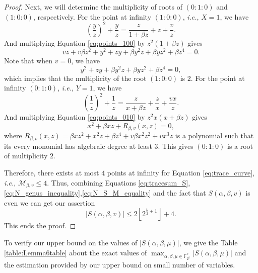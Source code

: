 \documentclass[preprint,10pt]{elsarticle}
\newcommand{\F}{\mathbb{F}}
\newcommand{\0}{\textbf{0}}
\newcommand{\1}{\textbf{1}}
\theoremstyle{plain}
\begin{document}
\begin{proof}
        Next, we will determine the multiplicity of roots of $(0 : 1 : 0)$ and $(1 : 0 : 0)$, respectively.
        For the point at infinity $(1 : 0 : 0)$, \emph{i.e.}, $X = 1$, we have
        \begin{equation}\label{eq:points_100}
            \left( \frac{y}{z} \right)^2+\frac{y}{z}=\frac{z}{1+\beta z}+z+\frac{v}{z}.
        \end{equation}
        And multiplying Equation \eqref{eq:points_100} by $z^2(1+\beta z)$ gives
        \[vz+v\beta z^2+y^2+zy+\beta y^2z+\beta yz^2+\beta z^4=0.\]
        Note that when $v=0$, we have
        \[y^2+zy+\beta y^2z+\beta yz^2+\beta z^4=0,\]
        which implies that the multiplicity of the root $(1:0:0)$ is $2$.
        For the point at infinity $(0 : 1 : 0 )$, \emph{i.e.}, $Y = 1$, we have
        \begin{equation}\label{eq:points_010}
            \left( \frac{1}{z} \right)^2+\frac{1}{z}=\frac{z}{x+\beta z}+\frac{z}{x}+\frac{vx}{z}.
        \end{equation}
        And multiplying Equation \eqref{eq:points_010} by $z^2x(x+\beta z)$ gives
        \[x^2+\beta xz+R_{\beta,v}(x,z)=0,\]
        where $R_{\beta,v}(x,z)=\beta xz^2+x^2z+\beta z^4+v\beta x^2z^2+vx^3z$ is a polynomial
        such that its every monomial has algebraic degree at least $3$.
        This gives $(0 : 1 : 0)$ is a root of multiplicity $2$.

        Therefore, there exists at most $4$ points at infinity for Equation \eqref{eq:trace_curve}, \emph{i.e.},
        $\mathcal{M}_{\beta,v}\le 4$.
        Thus, combining Equations \eqref{eq:tracesum_S},\eqref{eq:N_genus_inequality},\eqref{eq:N_S_M_equality} and the fact that
        $S(\alpha,\beta,v)$ is even we can get our assertion
        \[\left\lvert S(\alpha,\beta,v)\right\rvert \le 2\left\lfloor 2^{\frac{k}{2}+1}\right\rfloor+4.\]
        This ends the proof.
    \end{proof}

    To verify our upper bound on the values of $|S(\alpha,\beta,\mu)|$, we give the Table \ref{table:Lemma6table} about the exact values of $\max_{\alpha,\beta,\mu\in\F_{2^k}^*}|S(\alpha,\beta,\mu)|$ and the estimation provided by our upper bound on small number of variables.
\end{document}
